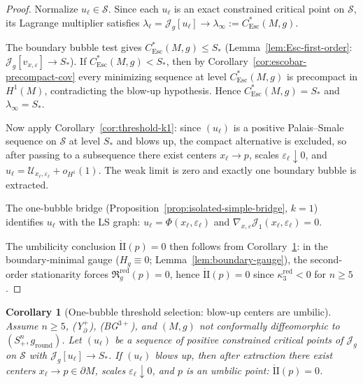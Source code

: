 \documentclass[11pt,reqno,a4paper]{amsart}
\numberwithin{equation}{section}
\theoremstyle{plain}
\newtheorem{corollary}[theorem]{Corollary}
\newcommand{\Esc}{\ensuremath{\mathrm{Esc}}}
\theoremstyle{remark}
\theoremstyle{plain}
\begin{document}
\begin{proof}
Normalize $u_\ell\in\mathcal S$. Since each $u_\ell$ is an exact
constrained critical point on $\mathcal S$, its Lagrange multiplier satisfies
$\lambda_\ell=\mathcal J_g[u_\ell]\to\lambda_\infty:=C^*_{\Esc}(M,g)$.

The boundary bubble test gives $C^*_{\Esc}(M,g)\le S_\ast$
(Lemma~\ref{lem:Esc-first-order}: $\mathcal J_g[v_{x,\varepsilon}]\to S_\ast$).
If $C^*_{\Esc}(M,g)<S_\ast$, then by Corollary~\ref{cor:escobar-precompact-cov}
every minimizing sequence at level $C^*_{\Esc}(M,g)$ is precompact in $H^1(M)$,
contradicting the blow-up hypothesis.
Hence $C^*_{\Esc}(M,g)=S_\ast$ and $\lambda_\infty=S_\ast$.

Now apply Corollary~\ref{cor:threshold-k1}: since $(u_\ell)$ is a positive
Palais--Smale sequence on $\mathcal S$ at level $S_\ast$ and blows up,
the compact alternative is excluded, so after passing to a subsequence
there exist centers $x_\ell\to p$, scales $\varepsilon_\ell\downarrow0$,
and $u_\ell=\mathcal U_{x_\ell,\varepsilon_\ell}+o_{H^1}(1)$.
The weak limit is zero and exactly one boundary bubble is extracted.

The one-bubble bridge (Proposition~\ref{prop:isolated-simple-bridge},
$k=1$) identifies $u_\ell$ with the LS graph:
$u_\ell=\Phi(x_\ell,\varepsilon_\ell)$
and $\nabla_{x,\varepsilon}\mathcal J_1(x_\ell,\varepsilon_\ell)=0$.

The umbilicity conclusion $\mathring{\mathrm{II}}(p)=0$ then follows from
Corollary~\ref{cor:threshold-Sstar-onebubble}:
in the boundary-minimal gauge ($H_g\equiv0$; Lemma~\ref{lem:boundary-gauge}),
the second-order stationarity forces $\mathfrak R_g^{\mathrm{red}}(p)=0$,
hence $\mathring{\mathrm{II}}(p)=0$ since $\kappa_3^{\mathrm{red}}<0$ for $n\ge5$.
\end{proof}

\begin{corollary}[One-bubble threshold selection: blow-up centers are umbilic]
\label{cor:threshold-Sstar-onebubble}
Assume $n\ge5$, \textup{(Y$^+_{\partial}$)}, \textup{(BG$^{3+}$)}, and
$(M,g)$ not conformally diffeomorphic to $(S^n_+,g_{\mathrm{round}})$.
Let $(u_\ell)$ be a sequence of positive constrained critical points of $\mathcal J_g$ on $\mathcal S$ with
$\mathcal J_g[u_\ell]\to S_\ast$.
If $(u_\ell)$ blows up, then after extraction there exist centers $x_\ell\to p\in\partial M$,
scales $\varepsilon_\ell\downarrow0$, and
$p$ is an umbilic point: $\mathring{\mathrm{II}}(p)=0$.
\end{corollary}
\end{document}
